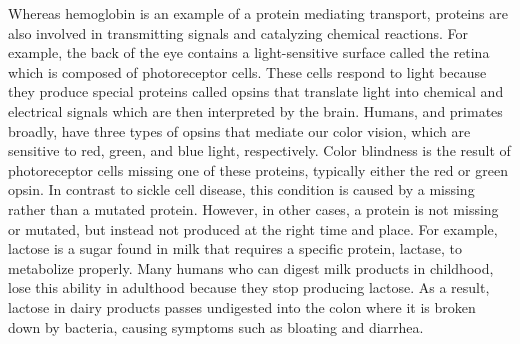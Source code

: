 Whereas hemoglobin is an example of a protein mediating transport, proteins are also involved in transmitting signals and catalyzing chemical reactions. For example, the back of the eye contains a light-sensitive surface called the retina which is composed of photoreceptor cells. These cells respond to light because they produce special proteins called opsins that translate light into chemical and electrical signals which are then interpreted by the brain. Humans, and primates broadly, have three types of opsins that mediate our color vision, which are sensitive to red, green, and blue light, respectively. Color blindness is the result of photoreceptor cells missing one of these proteins, typically either the red or green opsin. In contrast to sickle cell disease, this condition is caused by a missing rather than a mutated protein. However, in other cases, a protein is not missing or mutated, but instead not produced at the right time and place. For example, lactose is a sugar found in milk that requires a specific protein, lactase, to metabolize properly. Many humans who can digest milk products in childhood, lose this ability in adulthood because they stop producing lactose. As a result, lactose in dairy products passes undigested into the colon where it is broken down by bacteria, causing symptoms such as bloating and diarrhea.

